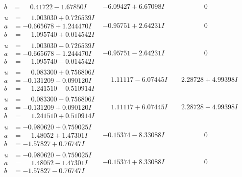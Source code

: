 \documentclass[1p]{elsarticle_modified}
\theoremstyle{definition}
\begin{document}
$$\begin{array}{c|c|c}
\begin{aligned}
b &= \phantom{-}0.41722 - 1.67850 I\end{aligned}
 & -6.09427 + 6.67098 I & \phantom{-0.000000 } 0 \\ \hline\begin{aligned}
u &= \phantom{-}1.003030 + 0.726539 I \\
a &= -0.665678 + 1.244470 I \\
b &= \phantom{-}1.095740 + 0.014542 I\end{aligned}
 & -0.95751 + 2.64231 I & \phantom{-0.000000 } 0 \\ \hline\begin{aligned}
u &= \phantom{-}1.003030 - 0.726539 I \\
a &= -0.665678 - 1.244470 I \\
b &= \phantom{-}1.095740 - 0.014542 I\end{aligned}
 & -0.95751 - 2.64231 I & \phantom{-0.000000 } 0 \\ \hline\begin{aligned}
u &= \phantom{-}0.083300 + 0.756806 I \\
a &= -0.131209 - 0.090120 I \\
b &= \phantom{-}1.241510 - 0.510914 I\end{aligned}
 & \phantom{-}1.11117 - 6.07445 I & \phantom{-}2.28728 + 4.99398 I \\ \hline\begin{aligned}
u &= \phantom{-}0.083300 - 0.756806 I \\
a &= -0.131209 + 0.090120 I \\
b &= \phantom{-}1.241510 + 0.510914 I\end{aligned}
 & \phantom{-}1.11117 + 6.07445 I & \phantom{-}2.28728 - 4.99398 I \\ \hline\begin{aligned}
u &= -0.980620 + 0.759025 I \\
a &= \phantom{-}1.48052 + 1.47301 I \\
b &= -1.57827 + 0.76747 I\end{aligned}
 & -0.15374 - 8.33088 I & \phantom{-0.000000 } 0 \\ \hline\begin{aligned}
u &= -0.980620 - 0.759025 I \\
a &= \phantom{-}1.48052 - 1.47301 I \\
b &= -1.57827 - 0.76747 I\end{aligned}
 & -0.15374 + 8.33088 I & \phantom{-0.000000 } 0 \\ \hline\begin{aligned}

\end{aligned}
\end{array}$$
\end{document}
